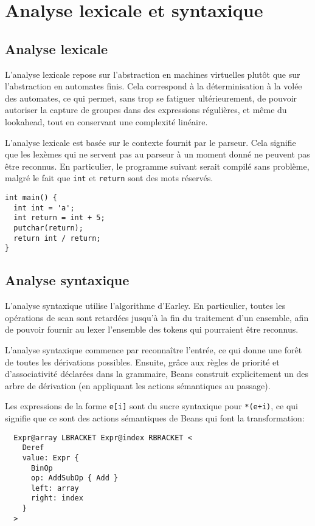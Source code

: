 \documentclass{scrartcl}
\begin{document}
\section*{Analyse lexicale et syntaxique}
\subsection*{Analyse lexicale}
L'analyse lexicale repose sur l'abstraction en machines virtuelles plutôt que sur
l'abstraction en automates finis. Cela correspond à la déterminisation à la volée
des automates, ce qui permet, sans trop se fatiguer ultérieurement, de pouvoir
autoriser la capture de groupes dans des expressions régulières, et même du
lookahead, tout en conservant une complexité linéaire.\par
L'analyse lexicale est basée sur le contexte fournit par le parseur. Cela
signifie que les lexèmes qui ne servent pas au parseur à un moment donné ne
peuvent pas être reconnus. En particulier, le programme suivant serait compilé
sans problème, malgré le fait que \verb|int| et \verb|return| sont des mots
réservés.
\pagebreak
\begin{verbatim}
int main() {
  int int = 'a';
  int return = int + 5;
  putchar(return);
  return int / return;
}
\end{verbatim}

\subsection*{Analyse syntaxique}
L'analyse syntaxique utilise l'algorithme d'Earley. En particulier, toutes les
opérations de scan sont retardées jusqu'à la fin du traitement d'un ensemble,
afin de pouvoir fournir au lexer l'ensemble des tokens qui pourraient être
reconnus.\par
L'analyse syntaxique commence par reconnaître l'entrée, ce qui donne une forêt
de toutes les dérivations possibles. Ensuite, grâce aux règles de priorité et
d'associativité déclarées dans la grammaire, Beans construit explicitement
un des arbre de dérivation (en appliquant les actions sémantiques au passage).\par
Les expressions de la forme \verb|e[i]| sont du sucre syntaxique pour \verb|*(e+i)|,
ce qui signifie que ce sont des actions sémantiques de Beans qui font la
transformation:
\begin{verbatim}
  Expr@array LBRACKET Expr@index RBRACKET <
    Deref
    value: Expr {
      BinOp
      op: AddSubOp { Add }
      left: array
      right: index
    }
  >
\end{verbatim}
\end{document}
